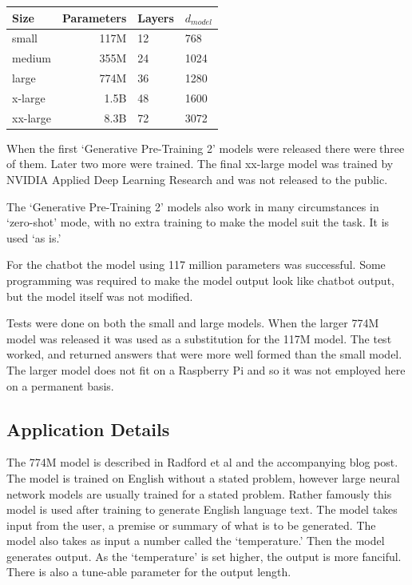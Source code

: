 \begin{center}

\begin{tabular}{lrll}
	Size & Parameters & Layers & $d_{model}$ \\
	\hline
	small & 117M       & 12     & 768          \\
	medium & 355M       & 24     & 1024         \\
	large & 774M       & 36     & 1280         \\
	x-large & 1.5B     & 48     & 1600 \\
	xx-large & 8.3B   &  72 &   3072 
\end{tabular}

	
\end{center}

When the first `Generative Pre-Training 2' models were released there were three of them. Later two more were trained. The final xx-large model was trained by NVIDIA Applied Deep Learning Research \cite{2019NVIDIAadlr} and was not released to the public.

The `Generative Pre-Training 2' models also work in many circumstances in `zero-shot' mode, with no extra training to make the model suit the task. It is used `as is.'

For the chatbot the model using 117 million parameters was successful. Some programming was required to make the model output look like chatbot output, but the model itself was not modified.

Tests were done on both the small and large models. When the larger 774M model was released it was used as a substitution for the 117M model. The test worked, and returned answers that were more well formed than the small model. The larger model does not fit on a Raspberry Pi and so it was not employed here on a permanent basis. %

\subsection{Application Details}
The 774M model is described in Radford et al \cite{radford2019language} and the accompanying blog post. The model is trained on English without a stated problem, however large neural network models are usually trained for a stated problem. Rather famously this model is used after training to generate English language text. The model takes input from the user, a premise or summary of what is to be generated. The model also takes as input a number called the `temperature.' Then the model generates output. As the `temperature' is set higher, the output is more fanciful. There is also a tune-able parameter for the output length. 

